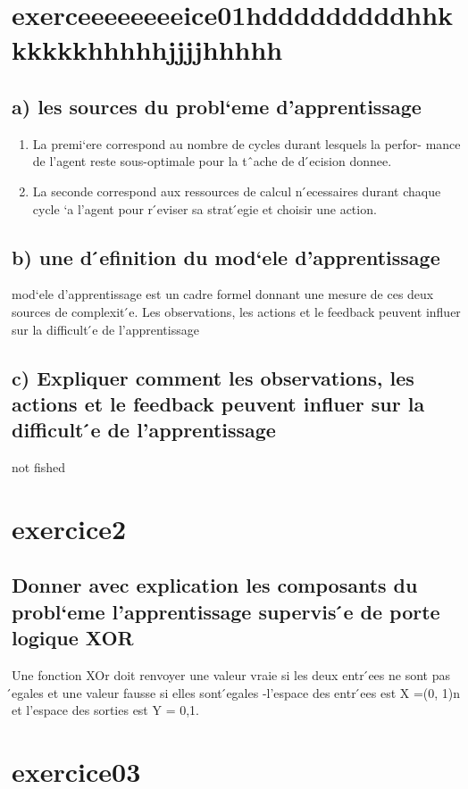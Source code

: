 \documentclass{article}
\begin{document}
\section*{exerceeeeeeeeice01hdddddddddhhkkkkkkhhhhhjjjjhhhhh}
    \subsection*{a) les sources du probl`eme d’apprentissage}
    \begin{enumerate}
        \item La premi`ere correspond au nombre de cycles durant lesquels la perfor-
        mance de l’agent reste sous-optimale pour la tˆache de d ́ecision donnee.
        \item La seconde correspond aux ressources de calcul n ́ecessaires durant chaque
        cycle `a l’agent pour r ́eviser sa strat ́egie et choisir une action.



    \end{enumerate}
    \subsection*{b)  une d ́efinition du mod`ele d’apprentissage}
    mod`ele d’apprentissage est un cadre formel donnant une mesure de ces deux
    sources de complexit ́e. Les observations, les actions et le feedback peuvent
    influer sur la difficult ́e de l’apprentissage
    \subsection*{c) Expliquer comment les observations, les actions et le feedback peuvent influer sur la difficult ́e de l’apprentissage}
    not fished


\section*{exercice2}

    \subsection*{Donner avec explication les composants du probl`eme
    l’apprentissage supervis ́e de porte logique XOR}
    Une fonction XOr doit renvoyer une valeur vraie si les deux entr ́ees ne sont
    pas  ́egales et une valeur fausse si elles sont  ́egales -l’espace des entr ́ees est X
    =(0, 1)n et l’espace des sorties est Y = 0,1.
\section*{exercice03}
\end{document}
